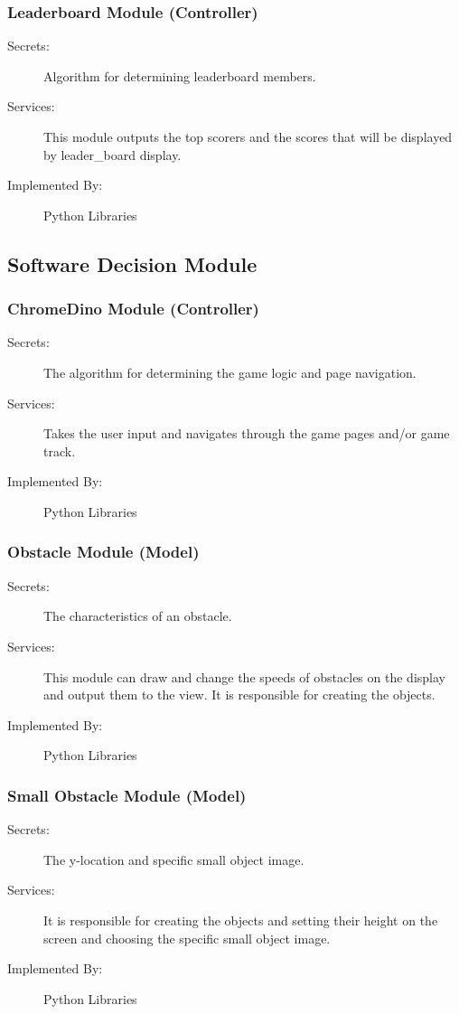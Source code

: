 \documentclass[12pt, titlepage]{article}
\begin{document}
\subsubsection{Leaderboard Module (Controller)}
\begin{description}
\item[Secrets:] Algorithm for determining leaderboard members.
\item[Services:] This module outputs the top scorers and the scores that will be displayed by leader\_board display.
\item[Implemented By:] Python Libraries
\end{description}

\subsection{Software Decision Module}

\subsubsection{ChromeDino Module (Controller)}
\begin{description}
\item[Secrets:] The algorithm for determining the game logic and page navigation. 
\item[Services:] Takes the user input and navigates through the game pages and/or game track.  
\item[Implemented By:] Python Libraries
\end{description}


\subsubsection{Obstacle Module (Model)}
\begin{description}
\item[Secrets:] The characteristics of an obstacle.
\item[Services:] This module can draw and change the speeds of obstacles on the display and output them to the view. It is responsible for creating the objects.
\item[Implemented By:] Python Libraries
\end{description}


\subsubsection{Small Obstacle Module (Model)}
\begin{description}
\item[Secrets:] The y-location and specific small object image. 
\item[Services:] It is responsible for creating the objects and setting their height on the screen and choosing the specific small object image.
\item[Implemented By:] Python Libraries
\end{description}
\end{document}
